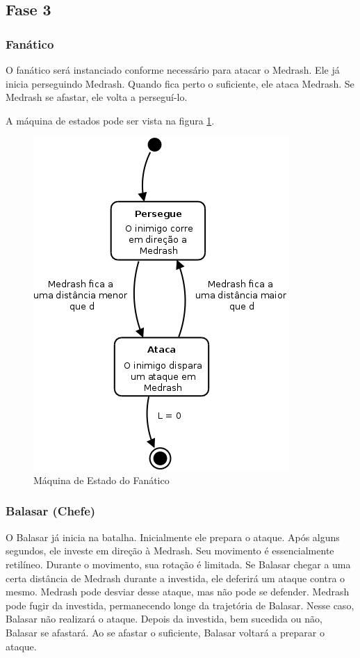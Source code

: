 \subsection{Fase 3}

\subsubsection{Fanático}

O fanático será instanciado conforme necessário para atacar o Medrash.
Ele já inicia perseguindo Medrash. Quando fica perto o suficiente, ele
ataca Medrash. Se Medrash se afastar, ele volta a perseguí-lo.

A máquina de estados pode ser vista na figura \ref{fsm:fanatico}.

\begin{figure}[!ht]
 \centering
 \includegraphics[scale=0.5]{ia_fanatico.png}
 \caption{Máquina de Estado do Fanático}
 \label{fsm:fanatico}
\end{figure}

\subsubsection{Balasar (Chefe)}

O Balasar já inicia na batalha. Inicialmente ele prepara o ataque.
Após alguns segundos, ele investe em direção à Medrash. Seu movimento
é essencialmente retilíneo. Durante o movimento, sua rotação é limitada.
Se Balasar chegar a uma certa distância de Medrash durante a investida,
ele deferirá um ataque contra o mesmo. Medrash pode desviar desse ataque,
mas não pode se defender. Medrash pode fugir da investida, permanecendo
longe da trajetória de Balasar. Nesse caso, Balasar não realizará o ataque.
Depois da investida, bem sucedida ou não, Balasar se afastará.
Ao se afastar o suficiente, Balasar voltará a preparar o ataque.

